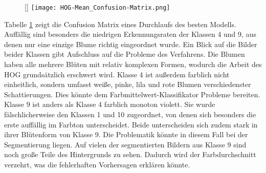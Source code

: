 \documentclass[11pt,a4paper]{article}
\begin{document}
\begin{figure}
	\raisebox{0pt}[\dimexpr{}\baselineskip\relax]{
	\texttt{[image: HOG-Mean\_Confusion-Matrix.png]}
	}
	\label{tab:cm_hog_mean}
\end{figure}
Tabelle \ref{tab:cm_hog_mean} zeigt die Confusion Matrix eines Durchlaufs des besten Modells. Auffällig sind besonders die niedrigen Erkennungsraten der Klassen 4 und 9, aus denen nur eine einzige Blume richtig eingeordnet wurde. Ein Blick auf die Bilder beider Klassen gibt Aufschluss auf die Probleme des Verfahrens. Die Blumen haben alle mehrere Blüten mit relativ komplexen Formen, wodurch die Arbeit des HOG grundsätzlich erschwert wird. Klasse 4 ist außerdem farblich nicht einheitlich, sondern umfasst weiße, pinke, lila und rote Blumen verschiedenster Schattierungen. Dies könnte dem Farbmittelwert-Klassifikator Probleme bereiten. Klasse 9 ist anders als Klasse 4 farblich monoton violett. Sie wurde fälschlicherweise den Klassen 1 und 10 zugeordnet, von denen sich besonders die erste auffällig im Farbton unterscheidet. Beide unterscheiden sich zudem stark in ihrer Blütenform von Klasse 9. Die Problematik könnte in diesem Fall bei der Segmentierung liegen. Auf vielen der segmentierten Bildern aus Klasse 9 sind noch große Teile des Hintergrunds zu sehen. Dadurch wird der Farbdurchschnitt verzehrt, was die fehlerhaften Vorhersagen erklären könnte.

\end{document}
